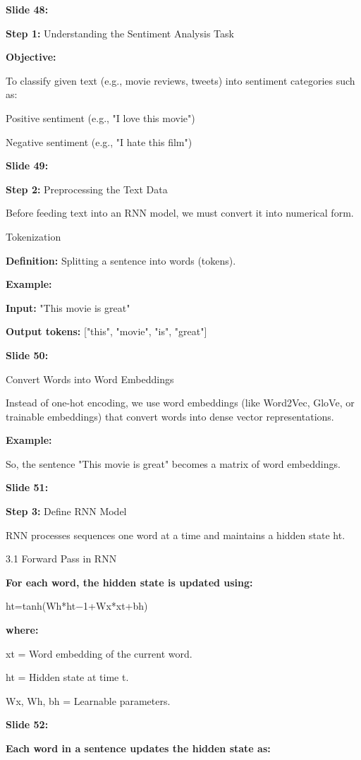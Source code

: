 \documentclass[11pt,a4paper]{article}
\begin{document}
\textbf{Slide 48:}

\textbf{Step 1:}  Understanding the Sentiment Analysis Task

\textbf{Objective:} 

To classify given text (e.g., movie reviews, tweets) into sentiment categories such as:

Positive sentiment (e.g., "I love this movie")

Negative sentiment (e.g., "I hate this film")

\textbf{Slide 49:}

\textbf{Step 2:}  Preprocessing the Text Data

Before feeding text into an RNN model, we must convert it into numerical form.

Tokenization

\textbf{Definition:}  Splitting a sentence into words (tokens).

\textbf{Example:} 

\textbf{Input:}  "This movie is great"

\textbf{Output tokens:}  ["this", "movie", "is", "great"]

\textbf{Slide 50:}

Convert Words into Word Embeddings

Instead of one-hot encoding, we use word embeddings (like Word2Vec, GloVe, or trainable embeddings) that convert words into dense vector representations.

\textbf{Example:} 

So, the sentence "This movie is great" becomes a matrix of word embeddings.​

\textbf{Slide 51:}

\textbf{Step 3:}  Define RNN Model

RNN processes sequences one word at a time and maintains a hidden state ht​.

3.1 Forward Pass in RNN

\textbf{For each word, the hidden state is updated using:} 

ht=tanh(Wh*ht−1+Wx*xt+bh)

\textbf{where:} 

xt​ = Word embedding of the current word.

ht​ = Hidden state at time t.

Wx​, Wh​, bh​ = Learnable parameters.

\textbf{Slide 52:}

\textbf{Each word in a sentence updates the hidden state as:} 
\end{document}
